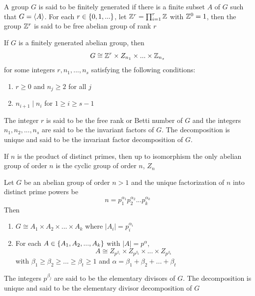 \begin{definition}
	A group $G$ is said to be finitely generated if there is a finite subset $A$ of $G$ such that $G = \langle A\rangle$. For each $r \in \{0, 1, ...\}$, let $\mathbb{Z}^r = \prod_{i=1}^r \mathbb{Z}$ with $\mathbb{Z}^0 = 1$, then the group $\mathbb{Z}^r$ is said to be free abelian group of rank $r$
\end{definition}

\begin{theorem}
	If $G$ is a finitely generated abelian group, then
	\[
	G \cong \mathbb{Z}^r \times Z_{n_1} \times ... \times \mathbb{Z}_{n_s}
	\]
	for some integers $r, n_1, ..., n_s$ satisfying the following conditions:
	\begin{enumerate}
		\item $r \geq 0$ and $n_j \geq 2$ for all $j$
		\item $n_{i+1} \mid n_i$ for $1 \geq i \geq s-1$
	\end{enumerate}
	The integer $r$ is said to be the free rank or Betti number of $G$ and the integers $n_1, n_2, ..., n_s$ are said to be the invariant factors of $G$. The decomposition is unique and said to be the invariant factor decomposition of $G$.
\end{theorem}

\begin{corollary}
	If $n$ is the product of distinct primes, then up to isomorphism the only abelian group of order $n$ is the cyclic group of order $n$, $Z_n$
\end{corollary}

\begin{theorem}
	Let $G$ be an abelian group of order $n > 1$ and the unique factorization of $n$ into distinct prime powers be
	\[
	n = p_1^{\alpha_1} p_2^{\alpha_2} ... p_k^{\alpha_k}
	\]
	Then
	\begin{enumerate}
		\item $G \cong A_1 \times A_2 \times ... \times A_k$ where $|A_i| = p_i^{\alpha_i}$
		\item For each $A \in \{A_1, A_2, ..., A_k\}$ with $|A| = p^\alpha$,
		\[
		A \cong Z_{p^{\beta_1}} \times Z_{p^{\beta_2}} \times ... \times Z_{p^{\beta_k}}
		\]
		with $\beta_1 \geq \beta_2 \geq ... \geq \beta_t \geq 1$ and $\alpha = \beta_1 + \beta_2 + ... + \beta_t$
	\end{enumerate}
	The integers $p^{\beta_j}$ are said to be the elementary divisors of $G$. The decomposition is unique and said to be the elementary divisor decomposition of $G$
\end{theorem}

